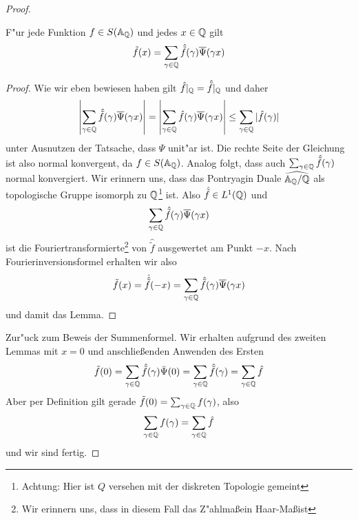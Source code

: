 \begin{proof}
		\begin{lemma}
			F"ur jede Funktion $f \in S(\mathbb{A}_{\mathbb{Q}})$ und jedes $x\in \mathbb{Q}$ gilt
			\begin{align*}
				\tilde{f}(x) = \sum_{\gamma \in \mathbb{Q}} {\hat{\tilde{f}}(\gamma)\overline{\Psi}(\gamma x)}
			\end{align*}
		\end{lemma}
		\begin{proof}
			Wie wir eben bewiesen haben gilt $\hat{f}|_{\mathbb{Q}} = \hat{\tilde{f}}|_{\mathbb{Q}}$ und daher
			\begin{align*}
				\left| \sum_{\gamma \in \mathbb{Q}} {\hat{\tilde{f}}(\gamma)\overline{\Psi}(\gamma x)}\right| = 
				\left| \sum_{\gamma \in \mathbb{Q}} {\hat{f}(\gamma)\overline{\Psi}(\gamma x)}\right| 
				\leq \sum_{\gamma \in \mathbb{Q}} {|\hat{f}(\gamma)|}
			\end{align*}
			unter Ausnutzen der Tatsache, dass $\Psi$ unit"ar ist. Die rechte Seite der Gleichung ist also normal konvergent, da $f \in S(\mathbb{A}_{\mathbb{Q}})$. Analog folgt, dass auch $\sum_{\gamma \in \mathbb{Q}} {\hat{\tilde{f}}(\gamma)}$ normal konvergiert. Wir erinnern uns, dass das Pontryagin Duale $\widehat{\mathbb{A}_{\mathbb{Q}}/\mathbb{Q}}$ als topologische Gruppe isomorph zu $\mathbb{Q}$\footnote{Achtung: Hier ist $Q$ versehen mit der diskreten Topologie gemeint} ist. Also $\hat{\tilde{f}} \in L^1(\mathbb{Q})$ und
			\begin{align*}
				\sum_{\gamma \in \mathbb{Q}} {\hat{\tilde{f}}(\gamma)\overline{\Psi}(\gamma x)}
			\end{align*}
			ist die Fouriertransformierte\footnote{Wir erinnern uns, dass in diesem Fall das Z"ahlma\ss ein Haar-Ma\ss ist} von $\hat{\tilde{f}}$ ausgewertet am Punkt $-x$. Nach Fourierinversionsformel erhalten wir also
			\begin{align*}
				\tilde{f}(x) = \hat{\hat{\tilde{f}}}(-x) = \sum_{\gamma \in \mathbb{Q}} {\hat{\tilde{f}}(\gamma)\overline{\Psi}(\gamma x)}
			\end{align*}
			und damit das Lemma.
		\end{proof}
		Zur"uck zum Beweis der Summenformel. Wir erhalten aufgrund des zweiten Lemmas mit $x=0$ und anschlie\ss enden Anwenden des Ersten
		\begin{align*}
			\tilde{f}(0) = 	\sum_{\gamma \in \mathbb{Q}} \hat{\tilde{f}}(\gamma) \bar{\Psi}(0) =
							\sum_{\gamma \in \mathbb{Q}} \hat{\tilde{f}}(\gamma) =
							\sum_{\gamma \in \mathbb{Q}} \hat{f}
		\end{align*}
		Aber per Definition gilt gerade $\tilde{f}(0) = \sum_{\gamma \in \mathbb{Q}}f(\gamma)$, also
		\begin{align*}
			\sum_{\gamma \in \mathbb{Q}}f(\gamma) = \sum_{\gamma \in \mathbb{Q}} \hat{f}
		\end{align*}
		und wir sind fertig.
	\end{proof}
	
